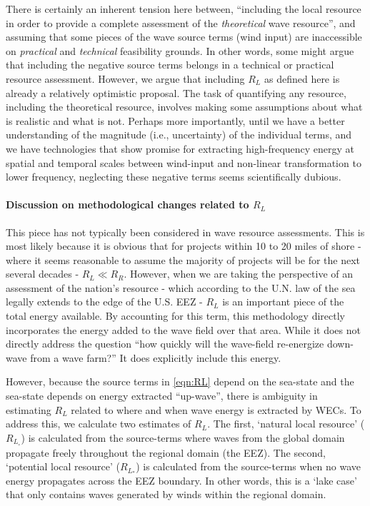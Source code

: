 There is certainly an inherent tension here between, ``including the local resource in order to provide a complete assessment of the {\em theoretical} wave resource'', and assuming that some pieces of the wave source terms (wind input) are inaccessible on {\em practical} and {\em technical} feasibility grounds. In other words, some might argue that including the negative source terms belongs in a technical or practical resource assessment. However, we argue that including $R_L$ as defined here is already a relatively optimistic proposal. 
The task of quantifying any resource, including the theoretical resource, involves making some assumptions about what is realistic and what is not. 
Perhaps more importantly, until we have a better understanding of the magnitude (i.e., uncertainty) of the individual terms, and we have technologies that show promise for extracting high-frequency energy at spatial and temporal scales between wind-input and non-linear transformation to lower frequency, neglecting these negative terms seems scientifically dubious.

\paragraph{Discussion on methodological changes related to $R_L$}

This piece has not typically been considered in wave resource assessments. This is most likely because it is obvious that for projects within 10 to 20 miles of shore - where it seems reasonable to assume the majority of projects will be for the next several decades - $R_L \ll R_R$. However, when we are taking the perspective of an assessment of the nation's resource - which according to the U.N. law of the sea legally extends to the edge of the U.S. EEZ - $R_L$ is an important piece of the total energy available. By accounting for this term, this methodology directly incorporates the energy added to the wave field over that area. While it does not directly address the question ``how quickly will the wave-field re-energize down-wave from a wave farm?'' It does explicitly include this energy. 

However, because the source terms in \eqref{eqn:RL} depend on the sea-state and the sea-state depends on energy extracted ``up-wave'', there is ambiguity in estimating $R_L$ related to where and when wave energy is extracted by WECs. To address this, we calculate two estimates of $R_L$. The first, `natural local resource' ($R_{L_\circ}$) is calculated from the source-terms where waves from the global domain propagate freely throughout the regional domain (the EEZ). The second, `potential local resource' ($R_{L_*}$) is calculated from the source-terms when no wave energy propagates across the EEZ boundary. In other words, this is a `lake case' that only contains waves generated by winds within the regional domain.


